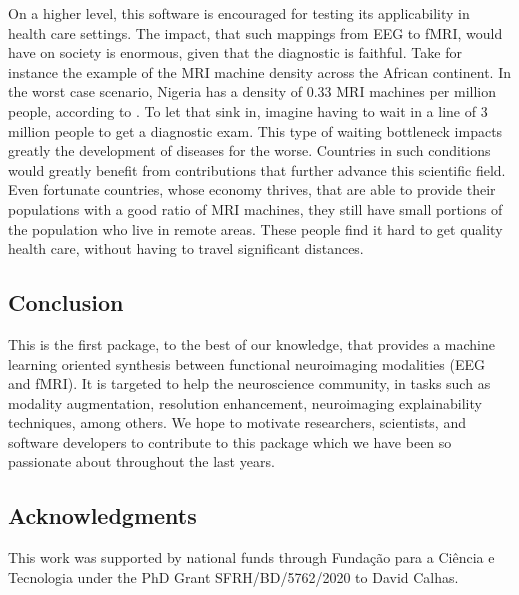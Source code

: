 On a higher level, this software is encouraged for testing its applicability in health care settings. The impact, that such mappings from EEG to fMRI, would have on society is enormous, given that the diagnostic is faithful. Take for instance the example of the MRI machine density across the African continent. In the worst case scenario, Nigeria has a density of 0.33 MRI machines per million people, according to \cite{ogbole2018survey}. To let that sink in, imagine having to wait in a line of 3 million people to get a diagnostic exam. This type of waiting bottleneck impacts greatly the development of diseases for the worse. Countries in such conditions would greatly benefit from contributions that further advance this scientific field. Even fortunate countries, whose economy thrives, that are able to provide their populations with a good ratio of MRI machines, they still have small portions of the population who live in remote areas. These people find it hard to get quality health care, without having to travel significant distances.  

\subsection{Conclusion}\label{section:conclusion}

This is the first package, to the best of our knowledge, that provides a machine learning oriented synthesis between functional neuroimaging modalities (EEG and fMRI). It is targeted to help the neuroscience community, in tasks such as modality augmentation, resolution enhancement, neuroimaging explainability techniques, among others. We hope to motivate researchers, scientists, and software developers to contribute to this package which we have been so passionate about throughout the last years.


 \subsection{Acknowledgments}\label{section:acknowledgments}

This work was supported by national funds through Funda\c{c}\~ao para a Ci\^encia e Tecnologia under the PhD Grant SFRH/BD/5762/2020 to David Calhas.
